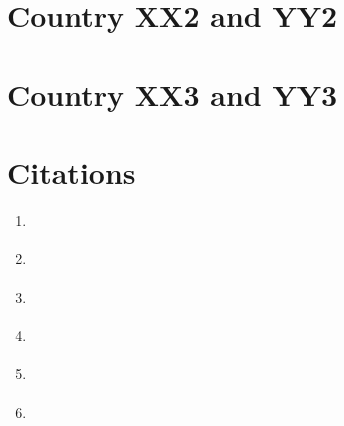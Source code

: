 \documentclass[11pt,a4paper,]{article}
\providecommand{\tightlist}{%
  \setlength{\itemsep}{0pt}\setlength{\parskip}{0pt}}
\begin{document}
\section*{Country XX2 and YY2}

\section*{Country XX3 and YY3}

\clearpage

\hypertarget{citations}{%
\section{Citations}\label{citations}}

\begin{enumerate}
\def\labelenumi{\arabic{enumi}.}
\tightlist
\item
  \textcite{tidyverse}
\item
  \textcite{readr}
\item
  \textcite{KableExtra}
\item
  \textcite{bookdown}
\item
  \textcite{bookdown2}
\item
  \textcite{lubridate}
\end{enumerate}

\clearpage

\printbibliography
\end{document}
